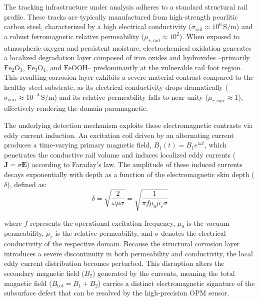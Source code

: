 The tracking infrastructure under analysis adheres to a standard structural
rail profile.
These tracks are typically manufactured from high-strength pearlitic carbon
steel, characterized by a high electrical conductivity ($\sigma_{\mathrm{rail}}
\approx 10^6\,\mathrm{S/m}$) and a robust ferromagnetic relative
permeability ($\mu_{r,\mathrm{rail}} \approx 10^2$). When exposed to
atmospheric oxygen and persistent moisture, electrochemical oxidation
generates a localized degradation layer composed of iron oxides and
hydroxides --primarily $\mathrm{Fe_2O_3}$, $\mathrm{Fe_3O_4}$, and
$\mathrm{FeOOH}$-- predominantly at the vulnerable rail foot region. This
resulting corrosion layer exhibits a severe material contrast compared to
the healthy steel substrate, as its electrical conductivity drops
dramatically ($\sigma_{\mathrm{corr}} \approx 10^{-4}\,\mathrm{S/m}$) and
its relative permeability falls to near unity ($\mu_{r,\mathrm{corr}}
\approx 1$), effectively rendering the domain paramagnetic.

The underlying detection mechanism exploits these electromagnetic contrasts
via eddy current induction. An excitation coil driven by an alternating
current produces a time-varying primary magnetic field, $B_1(t) = B_1
e^{i\omega t}$, which penetrates the conductive rail volume and induces
localized eddy currents ($\mathbf{J} = \sigma \mathbf{E}$) according to
Faraday's law. The amplitude of these induced currents decays exponentially
with depth as a function of the electromagnetic skin depth ($\delta$),
defined as:
\begin{equation}
    \delta = \sqrt{\frac{2}{\omega\mu\sigma}}
           = \sqrt{\frac{1}{\pi f \mu_0 \mu_r \sigma}}
    \label{eq:skin_depth}
\end{equation}

\noindent where $f$ represents the operational excitation frequency, $\mu_0$
is the vacuum permeability, $\mu_r$ is the relative permeability, and
$\sigma$ denotes the electrical conductivity of the respective domain.
Because the structural corrosion layer introduces a severe discontinuity in
both permeability and conductivity, the local eddy current distribution
becomes perturbed. This disruption alters the secondary
magnetic field ($B_2$) generated by the currents, meaning the total magnetic
field ($B_{\mathrm{tot}} = B_1 + B_2$) carries a distinct electromagnetic
signature of the subsurface defect that can be resolved by the high-precision
OPM sensor.

